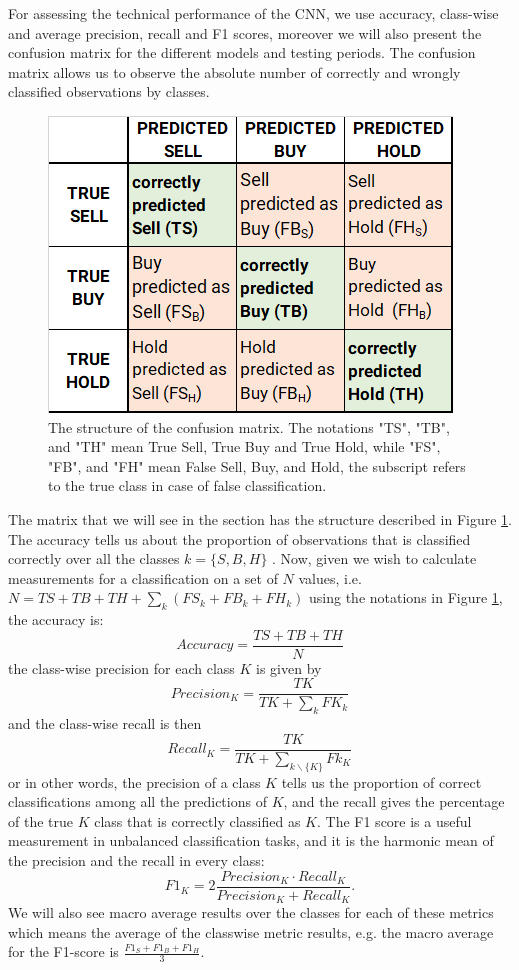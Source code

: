 \documentclass[11pt, a4paper]{article}
\begin{document}
For assessing the technical performance of the CNN, we use accuracy, class-wise and average precision, recall and F1 scores, moreover we will also present the confusion matrix for the different models and testing periods. 
The confusion matrix allows us to observe the absolute number of correctly and wrongly classified observations by classes. 
\begin{figure}[ht]
    \centering
    \includegraphics[width=.5\textwidth]{images/Confusion_matrix.png}
    \caption{The structure of the confusion matrix. The notations "TS", "TB", and "TH" mean True Sell, True Buy and True Hold, while "FS", "FB", and "FH" mean False Sell, Buy, and Hold, the subscript refers to the true class in case of false classification.}
    \label{fig:cmdef}
\end{figure}
The matrix that we will see in the section  has the structure described in Figure \ref{fig:cmdef}.
The accuracy tells us about the proportion of observations that is classified correctly over all the classes $k = \{S, B, H\}$ . Now, given we wish to calculate measurements for a classification on a set of $N$ values, i.e. $N = TS + TB + TH + \sum_k \left(FS_k + FB_k + FH_k\right)$ using the notations in Figure \ref{fig:cmdef}, the accuracy is:
\begin{equation}
    \label{eq:acc}
    Accuracy = \frac{TS + TB + TH}{N}
\end{equation}
the class-wise precision for each class $K$ is given by
\begin{equation}
    \label{eq:pr}
    Precision_K = \frac{TK}{TK +  \sum_k FK_k}
\end{equation}
and the class-wise recall is then 
\begin{equation}
    \label{eq:rec}
    Recall_K = \frac{TK}{TK +  \sum_{k  \smallsetminus \{K\}} Fk_K}
\end{equation}
or in other words, the precision of a class $K$ tells us the proportion of correct classifications among all the predictions of $K$, and the recall gives the percentage of the true $K$ class that is correctly classified as $K$. The F1 score is a useful measurement in unbalanced classification tasks, and it is the harmonic mean of the precision and the recall in every class:
\begin{equation}
    \label{eq:f1}
    F1_K = 2 \frac{Precision_K \cdot Recall_K}{Precision_K + Recall_K}.
\end{equation}
We will also see macro average results over the classes for each of these metrics which means the average of the classwise metric results, e.g. the macro average for the F1-score is $\frac{F1_S + F1_B + F1_H}{3}$.
\end{document}
